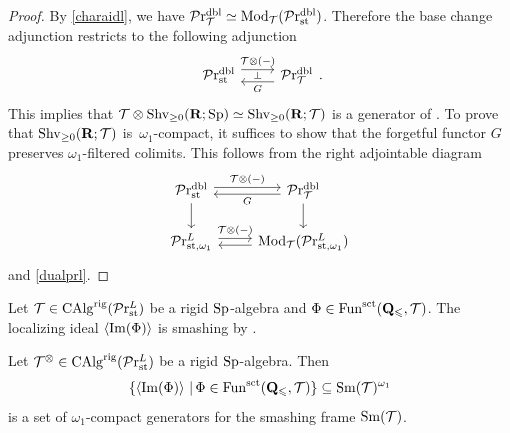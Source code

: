 \documentclass[10pt,a4paper,oneside]{article}
\begin{document}
\begin{proof}
By \cref{charaidl}, we have $\mathcal{P}\mathrm{r}_{\mathcal{T}}^{\operatorname{dbl}}\simeq \operatorname{Mod}_{\mathcal{T}}(\mathcal{P}\mathrm{r}_{\operatorname{st}}^{\operatorname{dbl}})$. Therefore the base change adjunction restricts to the following adjunction
$$ \begin{tikzcd}
\prstdbl  \arrow[r, "\mct\otimes(-)", shift right=-1ex]  & \arrow[l,"\perp"', "G", shift right=-1ex] \lintdbl \end{tikzcd}.$$
This implies that $\mathcal{T}\otimes\operatorname{Shv}_{\geq0}(\mathbf{R};\operatorname{Sp})\simeq\operatorname{Shv}_{\geq0}(\mathbf{R};\mathcal{T})$ is a generator of \lintdbl.
To prove that $\operatorname{Shv}_{\geq0}(\mathbf{R};\mathcal{T})$ is~$\omega_1$-compact, it suffices to show that the forgetful functor $G$ preserves $\omega_1$-filtered colimits. This follows from the right adjointable diagram
$$
\begin{tikzcd}
\prstdbl \arrow[d] \arrow[r, "\mct\otimes(-)", shift left] & \lintdbl \arrow[d] \arrow[l, "G", shift left] \\
\prl_{\op{st},\omega_1} \arrow[r, "\mct\otimes(-)", shift left]              &  \arrow[l, shift left]    \modu_{\mct}(\prl_{\op{st},\omega_1})         
\end{tikzcd}
$$
and \cref{dualprl}.
\end{proof}

\begin{rem}
Let $\mathcal{T}\in\operatorname{CAlg}^{\operatorname{rig}}(\mathcal{P}\mathrm{r}_{\operatorname{st}}^L)$ be a rigid $\operatorname{Sp}$-algebra and $\Phi\in\operatorname{Fun}^{\operatorname{sct}}(\mathbf{Q}_{\leqslant},\mathcal{T})$. The localizing ideal $\left<\operatorname{Im}(\Phi)\right>$ is smashing by \cite[Lemma 2.61]{ramzi2024dualizable}.
\end{rem}

\begin{thm}
Let $\mathcal{T}^\otimes\in\operatorname{CAlg}^{\operatorname{rig}}(\mathcal{P}\mathrm{r}_{\operatorname{st}}^L)$ be a rigid $\operatorname{Sp}$-algebra. Then $$\{\left<\operatorname{Im}(\Phi)\right>\,|\, \Phi\in \operatorname{Fun}^{\operatorname{sct}}(\mathbf{Q}_{\leqslant},\mathcal{T})\}\subseteq \operatorname{Sm}(\mathcal{T})^{\omega_1}$$ is a set of $\omega_1$-compact generators for the smashing frame $\operatorname{Sm}(\mathcal{T})$.
\end{thm}
\end{document}
